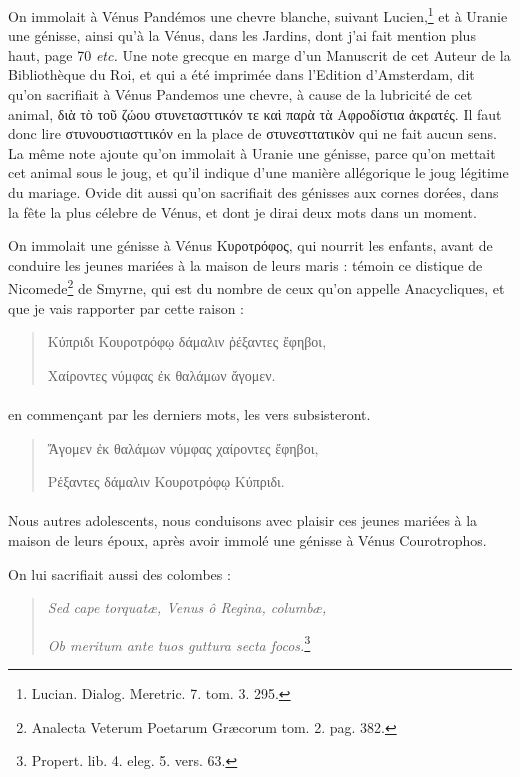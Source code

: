\documentclass[a4paper, 18pt, oneside]{article}
\begin{document}
On immolait à Vénus Pandémos une chevre blanche, suivant Lucien,\footnote{Lucian. Dialog. Meretric. 7. tom. 3. 295.} et à Uranie une génisse, ainsi qu'à la Vénus, dans les Jardins, dont j'ai fait mention plus haut, page 70 \emph{etc.} Une note grecque en marge d'un Manuscrit de cet Auteur de la Bibliothèque du Roi, et qui a été imprimée dans l'Edition d'Amsterdam, dit qu'on sacrifiait à Vénus Pandemos une chevre, à cause de la lubricité de cet animal, διὰ τὸ τοῦ ζώου στυνετασττικόν τε καὶ παρὰ τὰ Αφροδίστια ἀκρατές. Il faut donc lire στυνουστιασττικόν en la place de στυνεσττατικὸν qui ne fait aucun sens. La même note ajoute qu'on immolait à Uranie une génisse, parce qu'on mettait cet animal sous le joug, et qu'il indique d'une manière allégorique le joug légitime du mariage. Ovide dit aussi qu'on sacrifiait des génisses aux cornes dorées, dans la fête la plus célebre de Vénus, et dont je dirai deux mots dans un moment.

On immolait une génisse à Vénus Κυροτρόφος, qui nourrit les enfants, avant de conduire les jeunes mariées à la maison de leurs maris : témoin ce distique de Nicomede\footnote{Analecta Veterum Poetarum Græcorum tom. 2. pag. 382.} de Smyrne, qui est du nombre de ceux qu'on appelle Anacycliques, et que je vais rapporter par cette raison :
\begin{quotation}
Κύπριδι Κουροτρόφῳ δάμαλιν ῥέξαντες ἔφηβοι,

\hspace*{5mm}Χαίροντες νύμφας ἐκ θαλάμων ἄγομεν.
\end{quotation}
\paragraph{}
en commençant par les derniers mots, les vers subsisteront.
\begin{quotation}
Ἄγομεν ἐκ θαλάμων νύμφας χαίροντες ἔφηβοι,

\hspace*{5mm}Ρέξαντες δάμαλιν Κουροτρόφῳ Κύπριδι.
\end{quotation}
\paragraph{}
Nous autres adolescents, nous conduisons avec plaisir ces jeunes mariées à la maison de leurs époux, après avoir immolé une génisse à Vénus Courotrophos.

On lui sacrifiait aussi des colombes :
\begin{quotation}
\emph{Sed cape torquatæ, Venus ô Regina, columbæ,}

\hspace*{5mm}\emph{Ob meritum ante tuos guttura secta focos.}\footnote{Propert. lib. 4. eleg. 5. vers. 63.}
\end{quotation}
\end{document}
